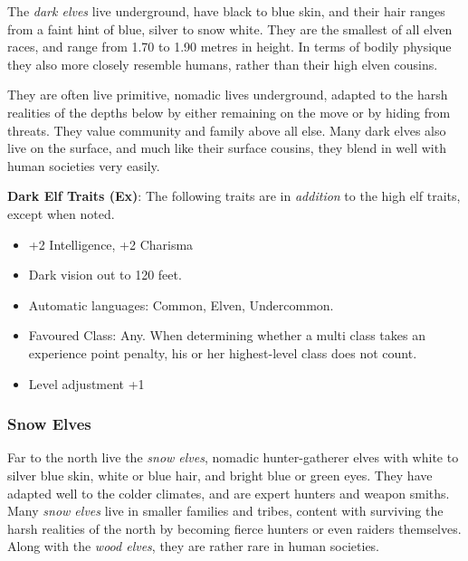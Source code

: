 The \emph{dark elves} live underground, have black to blue skin, and their
hair ranges from a faint hint of blue, silver to snow white. They are the
smallest of all elven races, and range from 1.70 to 1.90 metres in height.
In terms of bodily physique they also more closely resemble humans, rather
than their high elven cousins.

They are often live primitive, nomadic lives underground, adapted to the harsh
realities of the depths below by either remaining on the move or by hiding
from threats. They value community and family above all else. Many dark elves
also live on the surface, and much like their surface cousins, they blend in
well with human societies very easily.

\begin{35e}
  \textbf{Dark Elf Traits (Ex)}: The following traits are in \emph{addition}
  to the high elf traits, except when noted.
  \begin{itemize}[noitemsep]
    \item +2 Intelligence, +2 Charisma
    \item Dark vision out to 120 feet.
    \item Automatic languages: Common, Elven, Undercommon.
    \item Favoured Class: Any. When determining whether a multi class takes an
    experience point penalty, his or her highest-level class does not count.
    \item Level adjustment +1
  \end{itemize}
\end{35e}

\subsubsection*{Snow Elves}


Far to the north live the \emph{snow elves}, nomadic hunter-gatherer elves
with white to silver blue skin, white or blue hair, and bright blue or green
eyes. They have adapted well to the colder climates, and are expert hunters
and weapon smiths. Many \emph{snow elves} live in smaller families and tribes,
content with surviving the harsh realities of the north by becoming fierce
hunters or even raiders themselves. Along with the \emph{wood elves}, they
are rather rare in human societies.

